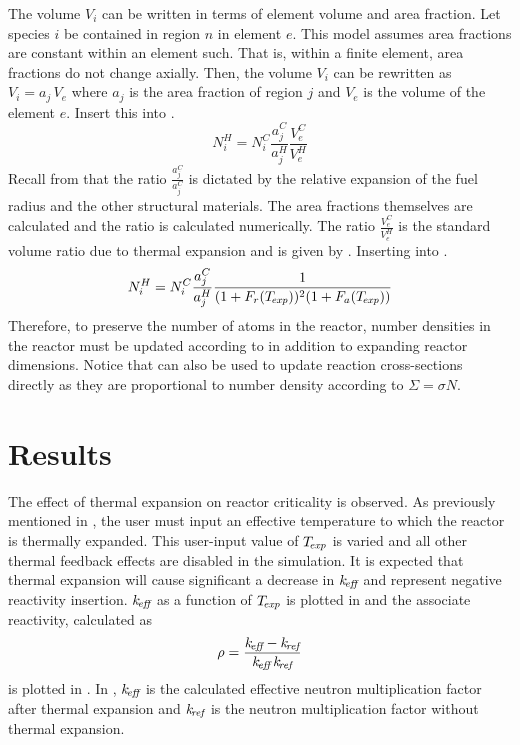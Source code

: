     The volume $V_i$ can be written in terms of element volume and area
    fraction. Let species $i$ be contained in region $n$ in element $e$. This
    model assumes area fractions are constant within an element such. That is,
    within a finite element, area fractions do not change axially. Then, the
    volume $V_i$ can be rewritten as $V_i = a_j \, V_e$ where $a_j$ is the area
    fraction of region $j$ and $V_e$ is the volume of the element $e$. Insert
    this into .
    \begin{equation}
      \label{eq:nden_expansion_expanded}
      N_i^H = N_i^C \frac{a_j^C}{a_j^H} \frac{V_e^C}{V_e^H}
    \end{equation}
    Recall from  that the
    ratio $\frac{a_j^C}{a_j^C}$ is dictated by the relative expansion of the
    fuel radius and the other structural materials. The area fractions
    themselves are calculated and the ratio is calculated numerically. The ratio
    $\frac{V_e^C}{V_e^H}$ is the standard volume ratio due to thermal expansion
    and is given by . Inserting 
    into .
    \begin{equation}
      \label{eq:nden_thexp_update}
      N_i^H = N_i^C \frac{a_j^C}{a_j^H} 
        \frac{1}{(1+F_r(T_{\!\mbox{\scriptsize \em exp}}))^2 (1+F_a(T_{\!\mbox{\scriptsize \em exp}}))}
    \end{equation}
    Therefore, to preserve the number of atoms in the reactor, number densities
    in the reactor must be updated according to  in
    addition to expanding reactor dimensions. Notice that
     can also be used to update reaction 
    cross-sections directly as they are proportional to number density according
    to $\Sigma = \sigma N$.

\section{Results}
  The effect of thermal expansion on reactor criticality is observed. As
  previously mentioned in , 
  the user must input an effective temperature to which the reactor is thermally 
  expanded. This user-input value of $T_{\!\mbox{\scriptsize \em exp}}$ is varied and all other thermal 
  feedback effects are disabled in the simulation. It is expected that thermal 
  expansion will cause significant a decrease in $k_{\!\mbox{\scriptsize \em eff}}$ and represent negative 
  reactivity insertion. $k_{\!\mbox{\scriptsize \em eff}}$ as a function of $T_{\!\mbox{\scriptsize \em exp}}$ is plotted in 
   and the associate reactivity, calculated as
  \begin{equation}
    \label{eq:reactivity_formula}
    \rho = \frac{k_{\!\mbox{\scriptsize \em eff}} - k_{\!\mbox{\scriptsize \em ref}}}{k_{\!\mbox{\scriptsize \em eff}} \, k_{\!\mbox{\scriptsize \em ref}}}
  \end{equation}
  is plotted in . In
  , $k_{\!\mbox{\scriptsize \em eff}}$ is the calculated effective neutron 
  multiplication factor after thermal expansion and $k_{\!\mbox{\scriptsize \em ref}}$ is the neutron 
  multiplication factor without thermal expansion. 

